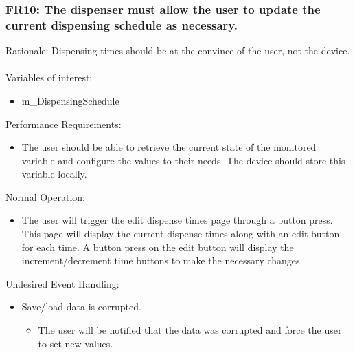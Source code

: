 \documentclass[12pt]{article}
\begin{document}
\subsubsection*{FR10: The dispenser must allow the user to update the current dispensing schedule as necessary.}
Rationale: Dispensing times should be at the convince of the user, not the device.
\\\\
Variables of interest:
\begin{itemize}[noitemsep,topsep=0pt]
    \item m\_DispensingSchedule
\end{itemize} 
\bigskip
Performance Requirements:
\begin{itemize}[noitemsep,topsep=0pt]
    \item The user should be able to retrieve the current state of the monitored variable and configure the values to their needs. The device should store this variable locally.
\end{itemize}
\bigskip
Normal Operation:
\begin{itemize}[noitemsep,topsep=0pt]
    \item The user will trigger the edit dispense times page through a button press. This page will display the current dispense times  along with an edit button for each time. A button press on the edit button will display the increment/decrement time buttons to make the necessary changes.
\end{itemize}
\bigskip
Undesired Event Handling:
\begin{itemize}[noitemsep,topsep=0pt]
    \item Save/load data is corrupted.
    \begin{itemize}
        \item The user will be notified that the data was corrupted and force the user to set new values.
    \end{itemize}
\end{itemize}
\bigskip

\end{document}
